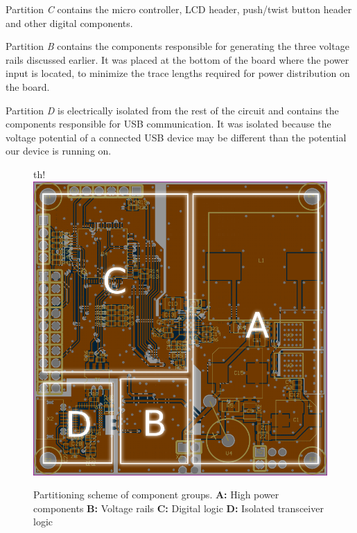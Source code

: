 Partition \emph{C} contains the micro  controller, LCD header, push/twist button
header and other digital components.

Partition \emph{B} contains the components  responsible for generating the three
voltage rails discussed earlier. It was placed at  the bottom of the board where
the  power input is located, to minimize the trace lengths  required  for  power
distribution on the board.

Partition \emph{D} is  electrically  isolated  from  the rest of the circuit and
contains  the  components responsible for USB  communication.  It  was  isolated
because the  voltage  potential  of a connected USB device may be different than
the potential our device is running on.

\begin{figure}{th!}
    \centering
    \includegraphics[width=.45\linewidth]{images/pcb/partitioning.png}
    \caption{Partitioning scheme of component groups.
        \textbf{A:} High power components
        \textbf{B:} Voltage rails
        \textbf{C:} Digital logic
        \textbf{D:} Isolated transceiver logic
    }
    \label{fig:pcb:partitioning}
\end{figure}


